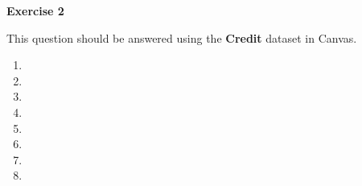 \textbf{Exercise 2}

\nl This question should be answered using the \textbf{Credit} dataset in Canvas.
\begin{enumerate}
\item 
\item 
\item 
\item 
\item 
\item 
\item 
\item 
\end{enumerate}
